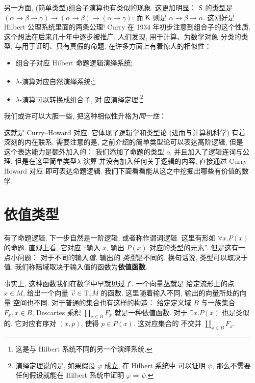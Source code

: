 另一方面, (简单类型)组合子演算也有类似的现象. 这更加明显：
\(\textsf{S}\) 的类型是 \((\alpha \to\beta\to\gamma)\to(\alpha\to\beta)\to(\alpha\to\gamma)\);
而 \(\textsf{K}\) 则是 \(\alpha \to \beta \to \alpha\).
这刚好是 Hilbert 公理系统里面的两条公理! Curry 在
1934 年初步注意到组合子的这个性质\cite{curry:1934:combinatorCH}.
这个想法在后来几十年中逐步被推广. 人们发现, 用于计算、为数学对象
分类的类型, 与用于证明、只有真假的命题, 在许多方面上有着惊人的相似性：
\begin{itemize}
\item 组合子对应 Hilbert 命题逻辑演绎系统;
\item \(\lambda\)-演算对应自然演绎系统;\footnote{这是与 Hilbert 系统不同的另一个演绎系统.}
\item \(\lambda\)-演算可以转换成组合子, 对
应演绎定理.\footnote{演绎定理说的是,
如果假设 \(\varphi\) 成立, 在 Hilbert 系统中
可以证明 \(\psi\), 那么不需要任何假设就能在 Hilbert
系统中证明 \(\varphi \Rightarrow \psi\).}
\end{itemize}

我们或许可以大胆一些, 把这种相似性升格为\emph{同一性}：


这就是 Curry--Howard 对应. 它体现了逻辑学和类型论
(进而与计算机科学) 有着深刻的内在联系.
需要注意的是, 之前介绍的简单类型论可以表达高阶逻辑, 但是
这个表达能力是额外加入的： 我们添加了命题的类型 \(o\),
并且加入了逻辑连词与公理. 但是在这里简单类型\(\lambda\)-演算
并没有加入任何关于逻辑的内容, 直接通过 Curry--Howard 对应
即可表达命题逻辑. 我们下面看看能从这之中挖掘出哪些有价值的数学.

\section{依值类型}

有了命题逻辑, 下一步自然是一阶逻辑, 或者称作谓词逻辑.
这里有形如 \(\forall x. P(x)\) 的命题. 直观上看,
它对应 “输入 \(x\), 输出 \(P(x)\) 对应的类型的元素”.
但是这有一点小问题： 对于不同的输入\emph{值}, 输出的%
\emph{类型}是不同的. 换句话说, 类型可以取决于值.
我们称陪域取决于输入值的函数为\textbf{依值函数}.

事实上, 这种函数我们在数学中早就见过了. 一个向量丛就是
给定流形上的点 \(x \in M\), 给出一个向量 \(\vec v \in \mathrm{T}_xM\)
的函数. 这里随着输入不同, 输出的向量所处的向量
空间也不同. 对于普通的集合也有这样的构造： 给定定义域 \(B\)
与一族集合 \(F_x, x \in B\), Descartes 乘积
\(\prod_{x\in B} F_x\) 就是一种依值函数.
对于 \(\exists x. P(x)\) 也是类似的. 它对应有序对
\((x, p)\), 使得 \(p \in P(x)\). 这对应集合的
不交并 \(\coprod_{x\in B} F_x\).

